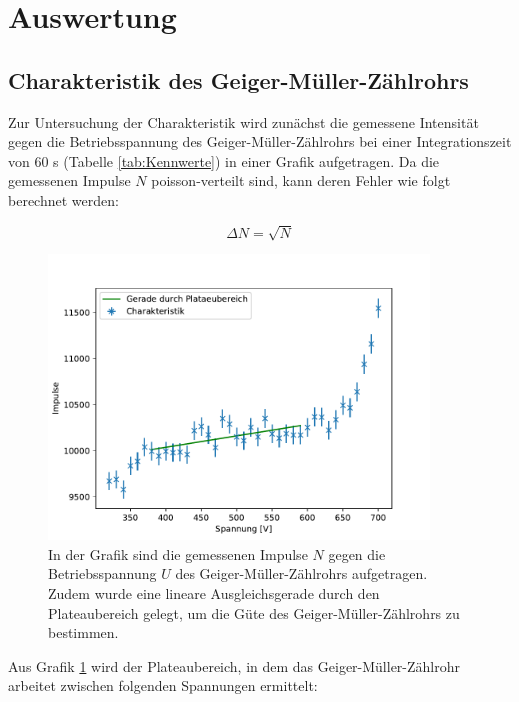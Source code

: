 \documentclass[titlepage = firstcover]{scrartcl}
\begin{document}
    \newpage
    \section{Auswertung}
        \subsection{Charakteristik des Geiger-Müller-Zählrohrs}
                Zur Untersuchung der Charakteristik wird zunächst die gemessene Intensität gegen die Betriebsspannung des Geiger-Müller-Zählrohrs bei einer Integrationszeit von 60 s (Tabelle
                \ref{tab:Kennwerte}) in einer Grafik aufgetragen. Da die gemessenen Impulse $N$ poisson-verteilt sind, kann deren Fehler wie folgt berechnet werden:

                \begin{equation*}
                    \Delta N = \sqrt{N}
                \end{equation*}

                \FloatBarrier

                 \begin{figure}[h]
                   \centering
                   \includegraphics[width = 0.9\textwidth]{Charakteristik.pdf}
                   \caption{In der Grafik sind die gemessenen Impulse $N$ gegen die Betriebsspannung $U$ des Geiger-Müller-Zählrohrs aufgetragen. Zudem wurde eine lineare Ausgleichsgerade durch den Plateaubereich gelegt, um die Güte des Geiger-Müller-Zählrohrs zu bestimmen.}
                   \label{fig:Charakteristik}
                 \end{figure}
             
                \FloatBarrier
                \noindent
                Aus Grafik \ref{fig:Charakteristik} wird der Plateaubereich, in dem das Geiger-Müller-Zählrohr arbeitet zwischen folgenden Spannungen ermittelt:
\end{document}
